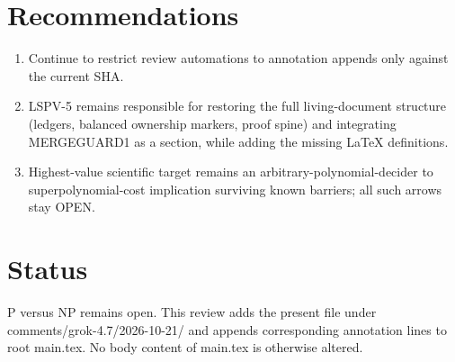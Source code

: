 \documentclass[11pt]{article}
\begin{document}
\section{Recommendations}
\begin{enumerate}
\item Continue to restrict review automations to annotation appends only against the current SHA.
\item LSPV-5 remains responsible for restoring the full living-document structure (ledgers, balanced ownership markers, proof spine) and integrating MERGEGUARD1 as a section, while adding the missing LaTeX definitions.
\item Highest-value scientific target remains an arbitrary-polynomial-decider to superpolynomial-cost implication surviving known barriers; all such arrows stay OPEN.
\end{enumerate}

\section{Status}
P versus NP remains open. This review adds the present file under comments/grok-4.7/2026-10-21/ and appends corresponding annotation lines to root main.tex. No body content of main.tex is otherwise altered.

\end{document}
